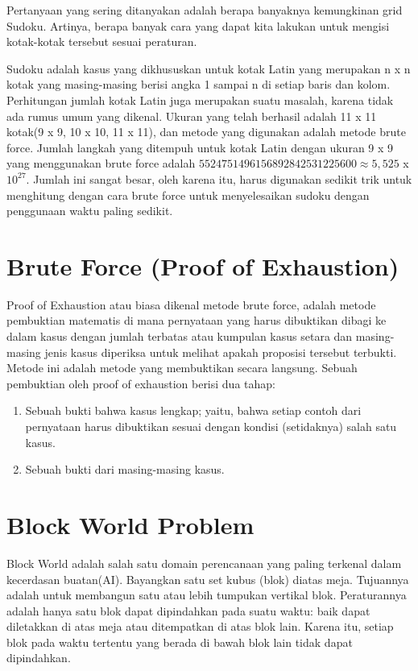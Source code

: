 \documentclass[11pt,a4paper]{report}
\begin{document}
\indent Pertanyaan yang sering ditanyakan adalah berapa banyaknya kemungkinan grid Sudoku. Artinya, berapa banyak cara yang dapat kita lakukan untuk mengisi kotak-kotak tersebut sesuai peraturan.

\indent Sudoku adalah kasus yang dikhususkan untuk kotak Latin yang merupakan n x n kotak yang masing-masing berisi angka 1 sampai n di setiap baris dan kolom. Perhitungan jumlah kotak Latin juga merupakan suatu masalah, karena tidak ada rumus umum yang dikenal. Ukuran yang telah berhasil adalah 11 x 11 kotak(9 x 9, 10 x 10, 11 x 11), dan metode yang digunakan adalah metode brute force. Jumlah langkah yang ditempuh untuk kotak Latin dengan ukuran 9 x 9 yang menggunakan brute force adalah $5524751496156892842531225600 \approx 5,525$ x $10^{27}$. Jumlah ini sangat besar, oleh karena itu, harus digunakan sedikit trik untuk menghitung dengan cara brute force untuk menyelesaikan sudoku dengan penggunaan waktu paling sedikit.

\section{Brute Force (Proof of Exhaustion)}
Proof of Exhaustion atau biasa dikenal metode brute force, adalah metode pembuktian matematis di mana pernyataan yang harus dibuktikan dibagi ke dalam kasus dengan jumlah terbatas atau kumpulan kasus setara dan masing-masing jenis kasus diperiksa untuk melihat apakah proposisi tersebut terbukti. Metode ini adalah metode yang membuktikan secara langsung. Sebuah pembuktian oleh proof of exhaustion berisi dua tahap:

\begin{enumerate}
	\item Sebuah bukti bahwa kasus lengkap; yaitu, bahwa setiap contoh dari pernyataan harus dibuktikan sesuai dengan kondisi (setidaknya) salah satu kasus.
	\item Sebuah bukti dari masing-masing kasus.
\end{enumerate}

\section{Block World Problem}
Block World adalah salah satu domain perencanaan yang paling terkenal dalam kecerdasan buatan(AI). Bayangkan satu set kubus (blok) diatas meja. Tujuannya adalah untuk membangun satu atau lebih tumpukan vertikal blok. Peraturannya adalah hanya satu blok dapat dipindahkan pada suatu waktu: baik dapat diletakkan di atas meja atau ditempatkan di atas blok lain. Karena itu, setiap blok pada waktu tertentu yang berada di bawah blok lain tidak dapat dipindahkan.
\end{document}
